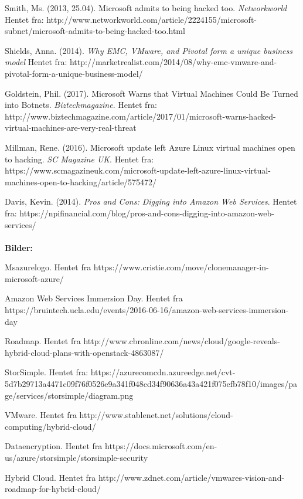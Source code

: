 \begin{thebibliography}{999}
\bibitem{} Smith, Ms. (2013, 25.04). Microsoft admits to being hacked too. \textit{Networkworld}
Hentet fra: http://www.networkworld.com/article/2224155/microsoft-subnet/microsoft-admits-to-being-hacked-too.html

\bibitem{} Shields, Anna. (2014). \textit{Why EMC, VMware, and Pivotal form a unique business model}
Hentet fra: http://marketrealist.com/2014/08/why-emc-vmware-and-pivotal-form-a-unique-business-model/

\bibitem{} Goldstein, Phil. (2017). Microsoft Warns that Virtual Machines Could Be Turned into Botnets. \textit{Biztechmagazine}. 
Hentet fra: http://www.biztechmagazine.com/article/2017/01/microsoft-warns-hacked-virtual-machines-are-very-real-threat

\bibitem{} Millman, Rene. (2016). Microsoft update left Azure Linux virtual machines open to hacking. \textit{SC Magazine UK}. 
Hentet fra: https://www.scmagazineuk.com/microsoft-update-left-azure-linux-virtual-machines-open-to-hacking/article/575472/

\bibitem{} Davis, Kevin. (2014). \textit{Pros and Cons: Digging into Amazon Web Services}. 
Hentet fra: https://npifinancial.com/blog/pros-and-cons-digging-into-amazon-web-services/

\paragraph{}\textbf{Bilder:}

\bibitem{}Msazurelogo. Hentet fra https://www.cristie.com/move/clonemanager-in-microsoft-azure/

\bibitem{} Amazon Web Services Immersion Day. Hentet fra https://bruintech.ucla.edu/events/2016-06-16/amazon-web-services-immersion-day

\bibitem{}Roadmap. Hentet fra http://www.cbronline.com/news/cloud/google-reveals-hybrid-cloud-plans-with-openstack-4863087/

\bibitem{} StorSimple. 
Hentet fra: https://azurecomcdn.azureedge.net/cvt-5d7b29713a4471c09f76f0526e9a341f048cd34f90636a43a421f075efb78f10/images/page/services/storsimple/diagram.png

\bibitem{}VMware. Hentet fra http://www.stablenet.net/solutions/cloud-computing/hybrid-cloud/

\bibitem{}Dataencryption. Hentet fra https://docs.microsoft.com/en-us/azure/storsimple/storsimple-security

\bibitem{}Hybrid Cloud. Hentet fra http://www.zdnet.com/article/vmwares-vision-and-roadmap-for-hybrid-cloud/
\end{thebibliography}